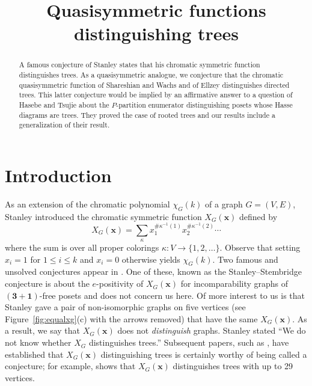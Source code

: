 \documentclass[ALCO,Unicode,published]{cedram}
\title{Quasisymmetric functions distinguishing trees}
\author{\firstname{Jean-Christophe} \lastname{Aval}}
\author{\firstname{Karimatou} \lastname{Djenabou}}
\author{\firstname{Peter} \middlename{R. W.} \lastname{McNamara}}
\newcommand{\x}{\mathbf{x}}
\begin{document}

\begin{abstract}
A famous conjecture of Stanley states that his chromatic symmetric function distinguishes trees.  As a quasisymmetric analogue, we conjecture that the chromatic quasisymmetric function of Shareshian and Wachs and of Ellzey distinguishes directed trees.  This latter conjecture would be implied by an affirmative answer to a question of Hasebe and Tsujie about the $P$-partition enumerator distinguishing posets whose Hasse diagrams are trees.   They proved the case of rooted trees and our results include a generalization of their result.
\end{abstract}


\maketitle

\section{Introduction}
 
As an extension of the chromatic polynomial $\chi_G(k)$ of a graph $G =  (V,E)$, Stanley \cite{Sta95} introduced the chromatic symmetric function $X_G(\x)$ defined by
\begin{equation}\label{equ:stanley}
X_G(\x) = \sum_\kappa x_1^{\# \kappa^{-1}(1)} x_2^{\# \kappa^{-1}(2)} \cdots
\end{equation}
where the sum is over all proper colorings $\kappa : V \to \{1,2,\ldots\}$.  Observe that setting $x_i=1$ for $1\leq i \leq k$ and $x_i=0$ otherwise yields $\chi_G(k)$.  Two famous and unsolved conjectures appear in \cite{Sta95}.  One of these, known as the Stanley--Stembridge conjecture \cite[Conj.~5.5]{StSt93}\cite[Conj.~5.1]{Sta95} is about the $e$-positivity of $X_G(\x)$ for incomparability graphs of $(\mathbf{3}+\mathbf{1})$-free posets and does not concern us here.  Of more interest to us is that Stanley gave a pair of non-isomorphic graphs on five vertices (see Figure~\ref{fig:equalxg}(c) with the arrows removed) that have the same $X_G(\x)$.  As a result, we say that $X_G(\x)$ does not \emph{distinguish} graphs.  Stanley stated ``We do not know whether $X_G$ distinguishes trees.''  Subsequent papers, such as \cite{AMZ17,AMZ21,AlZa14,Fou03,HeJi19,HuCh20,LoSe19,MMW08,OrSc14,SST15}, have established that $X_G(\x)$ distinguishing trees is certainly worthy of being called a conjecture; for example, \cite{HeJi19} shows that $X_G(\x)$ distinguishes trees with up to 29 vertices.
\end{document}

